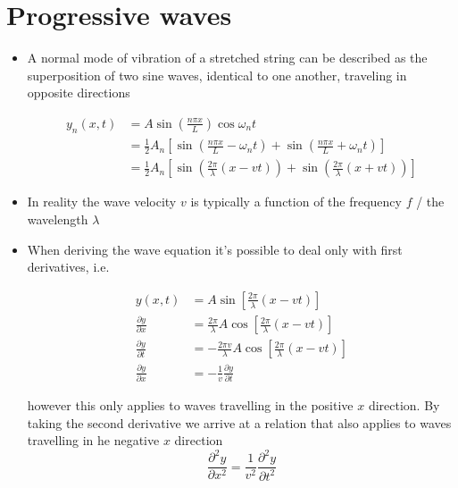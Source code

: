 \documentclass{article}
\begin{document}
\section{Progressive waves}

\begin{itemize}
  \item A normal mode of vibration of a stretched string can be described as the superposition of two sine waves, identical to one another, traveling in opposite directions

        \begin{align*}
          y_n(x, t) & = A \sin \left( \frac{n \pi x}{L} \right) \cos \omega_n t                                                                                  \\
                    & = \frac{1}{2} A_n \left[ \sin \left( \frac{n \pi x}{L} - \omega_n t \right) + \sin \left( \frac{n \pi x}{L} + \omega_n t \right) \right]   \\
                    & = \frac{1}{2} A_n \left[ \sin \left( \frac{2 \pi}{\lambda} (x - v t) \right) + \sin \left( \frac{2 \pi}{\lambda} (x + v t) \right) \right]
        \end{align*}

  \item In reality the wave velocity $v$ is typically a function of the frequency $f$ / the wavelength $\lambda$

  \item When deriving the wave equation it's possible to deal only with first derivatives, i.e.

        \begin{align*}
          y(x, t)                       & = A \sin \left[ \frac{2 \pi}{\lambda} (x - v t) \right]                          \\
          \frac{\partial y}{\partial x} & = \frac{2 \pi}{\lambda} A \cos \left[ \frac{2 \pi}{\lambda} (x - v t) \right]    \\
          \frac{\partial y}{\partial t} & = -\frac{2 \pi v}{\lambda} A \cos \left[ \frac{2 \pi}{\lambda} (x - v t) \right] \\
          \frac{\partial y}{\partial x} & = -\frac{1}{v} \frac{\partial y}{\partial t}
        \end{align*}

        however this only applies to waves travelling in the positive $x$ direction. By taking the second derivative we arrive at a relation that also applies to waves travelling in he negative $x$ direction \[\frac{\partial^2 y}{\partial x^2} = \frac{1}{v^2} \frac{\partial^2 y}{\partial t^2}\]


\end{itemize}
\end{document}
